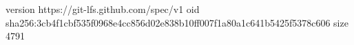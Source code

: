 version https://git-lfs.github.com/spec/v1
oid sha256:3cb4f1cbf535f0968e4cc856d02e838b10ff007f1a80a1c641b5425f5378c606
size 4791

